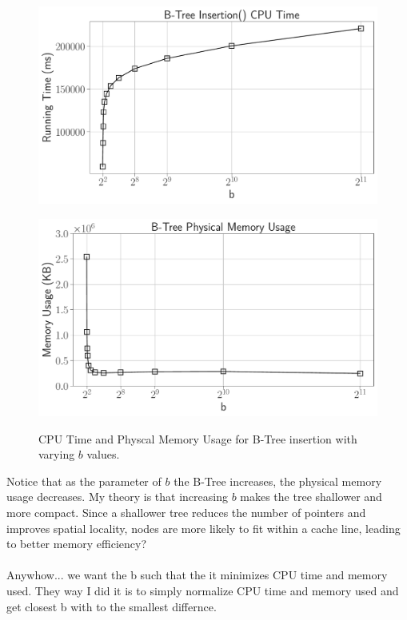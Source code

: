 \documentclass[12pt]{article}
\begin{document}
\begin{figure}[H]
	\centering

	\begin{minipage}{0.5\textwidth}
		\centering
		\includegraphics[width=\linewidth]{../notebook/plot/b-tree_insertion()_cpu_time.pdf}
		\label{fig:cpu_time}
	\end{minipage}\hfill
	\begin{minipage}{0.5\textwidth}
		\centering
		\includegraphics[width=\linewidth]{../notebook/plot/b-tree_physical_memory_usage.pdf}
		\label{fig:physical_memory}
	\end{minipage}\hfill
	\caption{CPU Time and Physcal Memory Usage for B-Tree insertion with varying $b$ values.}
\end{figure}

Notice that as the parameter of $b$ the B-Tree increases, the physical memory usage decreases. My theory is that increasing $b$ makes the tree shallower and more compact. Since a shallower tree reduces the number of pointers and improves spatial locality, nodes are more likely to fit within a cache line, leading to better memory efficiency?
\\\\
Anywhow... we want the b such that the it minimizes CPU time and memory used. They way I did it is to simply normalize CPU time and memory used and get closest b with to the smallest differnce. 
\end{document}
